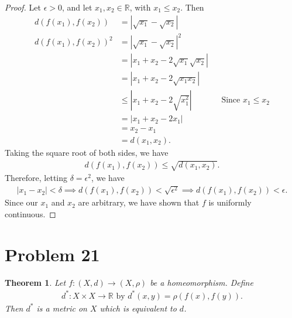 \documentclass[10pt,a4paper]{article}
\theoremstyle{theorem}
\newtheorem{theorem}{Theorem}
\theoremstyle{definition}
\begin{document}
\begin{proof}
Let $\epsilon > 0$, and let $x_1, x_2 \in \mathbb{R}$, with $x_1 \leq x_2$. Then
\begin{align*}
d(f(x_1), f(x_2)) &= |\sqrt{x_1} - \sqrt{x_2}|\\
d(f(x_1), f(x_2))^2 &= |\sqrt{x_1} - \sqrt{x_2}|^2\\
&= |x_{1} + x_{2} -2\sqrt{x_1}\sqrt{x_2}|\\
&= |x_{1} + x_{2} -2\sqrt{x_1x_2}|\\
&\leq |x_{1} + x_{2} -2\sqrt{x_{1}^2}| && \text{Since } x_1 \leq x_2\\
&= |x_{1} + x_{2} -2x_{1}|\\
&= x_2 - x_1\\
&= d(x_1, x_2).
\end{align*}
Taking the square root of both sides, we have
\begin{align*}
d(f(x_1), f(x_2)) \leq \sqrt{d(x_1,x_2)}.
\end{align*}
Therefore, letting $\delta = \epsilon^2$, we have
\begin{align*}
 |x_1 - x_2| < \delta \implies d(f(x_1), f(x_2)) < \sqrt{\epsilon^2} \implies d(f(x_1), f(x_2)) <  \epsilon.
\end{align*}
Since our $x_1$ and $x_2$ are arbitrary, we have shown that $f$ is uniformly continuous.
\end{proof}
 
\section*{Problem 21}
\begin{theorem}
Let $f:(X, d) \to (X, \rho)$ be a homeomorphism. Define
\begin{align*}
d^*:X \times X \to \mathbb{R} \text{ by } d^*(x, y) = \rho(f(x), f(y)).
\end{align*}
Then $d^*$ is a metric on $X$ which is equivalent to $d$.
\end{theorem}
 
\end{document}
